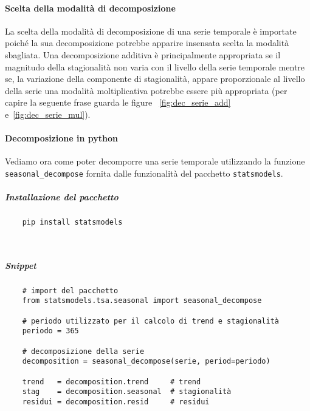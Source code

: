 \paragraph{Scelta della modalità di decomposizione}
La scelta della modalità di decomposizione di una serie temporale è importate poiché
la sua decomposizione potrebbe apparire insensata scelta la modalità sbagliata.
Una decomposizione additiva è principalmente appropriata se il magnitudo della 
stagionalità non varia con il livello della serie temporale mentre se, la variazione
della componente di stagionalità, appare proporzionale al livello della serie una modalità
moltiplicativa potrebbe essere più appropriata (per capire la seguente frase guarda le figure
~\ref{fig:dec_serie_add} e~\ref{fig:dec_serie_mul}).


\paragraph{Decomposizione in python}
Vediamo ora come poter decomporre una serie temporale utilizzando la funzione 
\texttt{seasonal\_decompose} fornita dalle funzionalità del pacchetto \texttt{statsmodels}.
\subparagraph*{Installazione del pacchetto}
\begin{verbatim}
    pip install statsmodels



\end{verbatim}

\subparagraph*{Snippet}
\begin{verbatim}
    # import del pacchetto 
    from statsmodels.tsa.seasonal import seasonal_decompose

    # periodo utilizzato per il calcolo di trend e stagionalità
    periodo = 365 

    # decomposizione della serie
    decomposition = seasonal_decompose(serie, period=periodo)

    trend   = decomposition.trend     # trend
    stag    = decomposition.seasonal  # stagionalità
    residui = decomposition.resid     # residui
\end{verbatim}